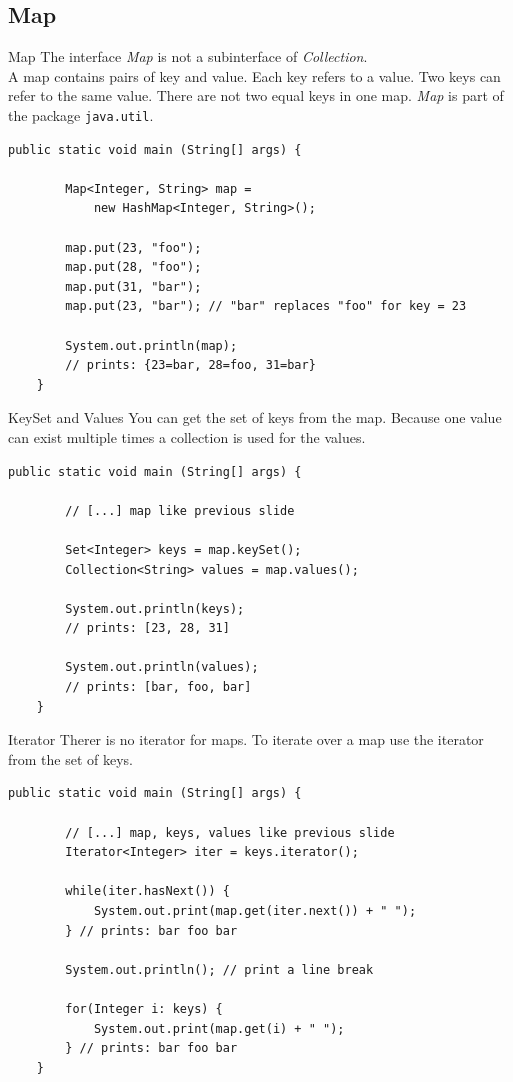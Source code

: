 \subsection{Map}
\begin{frame}[fragile]{Map}
	The interface \emph{Map} is not a subinterface of \emph{Collection}.\\
	A map contains pairs of key and value. Each key refers to a value. 
	Two keys can refer to the same value. There are not two equal keys in one map.
	\emph{Map} is part of the package \texttt{java.util}.
	\vfill
	\begin{lstlisting}[basicstyle=\ttfamily\scriptsize]
	public static void main (String[] args) {
	
	    Map<Integer, String> map = 
	        new HashMap<Integer, String>();
	    
	    map.put(23, "foo");
	    map.put(28, "foo");
	    map.put(31, "bar");
	    map.put(23, "bar"); // "bar" replaces "foo" for key = 23
	    
	    System.out.println(map);
	    // prints: {23=bar, 28=foo, 31=bar}
	}
	\end{lstlisting}
\end{frame}

\begin{frame}[fragile]{KeySet and Values}
	You can get the set of keys from the map.
	Because one value can exist multiple times a collection is used for the values.
	\begin{lstlisting}[basicstyle=\ttfamily\scriptsize]
	public static void main (String[] args) {
	
	    // [...] map like previous slide
	    
	    Set<Integer> keys = map.keySet();
	    Collection<String> values = map.values();
	    
	    System.out.println(keys);
	    // prints: [23, 28, 31]
	    
	    System.out.println(values);
	    // prints: [bar, foo, bar]
	}
	\end{lstlisting}
\end{frame}

\begin{frame}[fragile]{Iterator}
	Therer is no iterator for maps. 
	To iterate over a map use the iterator from the set of keys.
	\begin{lstlisting}[basicstyle=\ttfamily\scriptsize]
	public static void main (String[] args) {
	
	    // [...] map, keys, values like previous slide    	    
	    Iterator<Integer> iter = keys.iterator();
	    
	    while(iter.hasNext()) {
	        System.out.print(map.get(iter.next()) + " ");
	    } // prints: bar foo bar
	    
	    System.out.println(); // print a line break
	    
	    for(Integer i: keys) {
	        System.out.print(map.get(i) + " ");
	    } // prints: bar foo bar
	}
	\end{lstlisting}
\end{frame}

